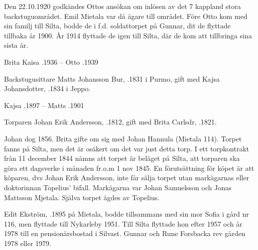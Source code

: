 Den 22.10.1920 godkändes Ottos ansökan om inlösen av det 7 kappland stora backstuguområdet. Emil Mietala var då ägare till
området. Före Otto kom med sin familj till Silta, bodde de i f.d. soldattorpet på Gunnar, dit de flyttade tillbaka år 1900. År 1914 flyttade de igen till Silta, där de kom att tillbringa sina sista år.

Brita Kaisa .1936  --  Otto .1939


Backstugusittare Matts Johansson Bur, .1831 i Purmo, gift med Kajsa Johansdotter, .1834 i Jeppo.
\begin{jhchildren}
  \item {}
  \item {}
  \item {}
  \item {}
  \item {}
\end{jhchildren}

Kajsa .1897  --  Matts .1901


Torparen Johan Erik Andersson,  .1812, gift med Brita Carlsdr, .1821.
\begin{jhchildren}
  \item {}
  \item {}
  \item {}
\end{jhchildren}

Johan dog 1856. Brita gifte om sig med Johan Hannula (Mietala 114). Torpet fanns på Silta, men det är osäkert om det var just detta torp. I ett torpkontrakt från 11 december 1844 nämns att torpet är beläget på Silta, att torparen ska göra ett dagsverke i månaden fr.o.m 1 nov 1845. En förutsättning för köpet är att köparen, dvs Johan Erik Andersson, inte får sälja torpet utan markägarnas eller doktorinnan Topelius' bifall. Markägarna var Johan Samuelsson och Jonas Mattsson Mjetala. Själva torpet ägdes av Topelius.





Edit Ekström, .1895 på Mietala, bodde tillsammans med sin mor Sofia i gård nr 116, men flyttade till Nykarleby 1951. Till Silta flyttade hon efter 1957 och år 1978 till en pensionärsbostad i Silvast. Gunnar och Rune Forsbacka rev gården 1978 eller 1979.

